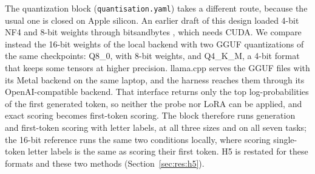 The quantization block (\texttt{quantisation.yaml}) takes a different route, because the usual one is closed on Apple silicon. An earlier draft of this design loaded 4-bit NF4 and 8-bit weights through bitsandbytes \citep{dettmers2023qlora,dettmers2022llmint8}, which needs CUDA. We compare instead the 16-bit weights of the local backend with two GGUF quantizations of the same checkpoints: Q8\_0, with 8-bit weights, and Q4\_K\_M, a 4-bit format that keeps some tensors at higher precision. llama.cpp serves the GGUF files with its Metal backend on the same laptop, and the harness reaches them through its OpenAI-compatible backend. That interface returns only the top log-probabilities of the first generated token, so neither the probe nor LoRA can be applied, and exact scoring becomes first-token scoring. The block therefore runs generation and first-token scoring with letter labels, at all three sizes and on all seven tasks; the 16-bit reference runs the same two conditions locally, where scoring single-token letter labels is the same as scoring their first token. H5 is restated for these formats and these two methods (Section~\ref{sec:res:h5}).

